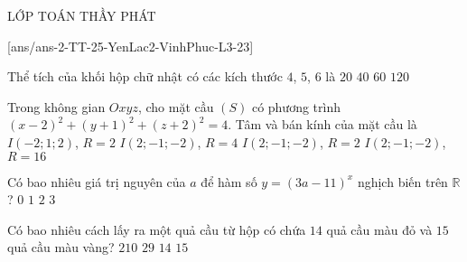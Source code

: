\begin{name}
	{\tenchude}{\tendethi}{LỚP TOÁN THẦY PHÁT}{\thoigian}
\end{name}
\setcounter{ex}{0}\setcounter{bt}{0}
[ans/ans-2-TT-25-YenLac2-VinhPhuc-L3-23]
\setcounter{ex}{0}


\begin{ex}%
	Thể tích của khối hộp chữ nhật có các kích thước $ 4 $, $ 5 $, $ 6 $ là
	\choice
	{$ 20 $}
	{$ 40 $}
	{$ 60 $}
	{\True $ 120 $}
\end{ex}

\begin{ex}%
	Trong không gian $ Oxyz $, cho mặt cầu $ (S) $ có phương trình $ (x-2)^2+(y+1)^2+(z+2)^2=4 $. Tâm và bán kính của mặt cầu là
	\choice
	{$ I(-2;1;2) $, $ R=2 $}
	{$ I(2;-1;-2) $, $ R=4 $}
	{\True $ I(2;-1;-2) $, $ R=2 $}
	{$ I(2;-1;-2) $, $ R=16 $}
\end{ex}


\begin{ex}%
	Có bao nhiêu giá trị nguyên của $ a $ để hàm số $ y=(3a-11)^x $ nghịch biến trên $ \mathbb{R} $?
	\choice
	{\True $ 0 $}
	{$ 1 $}
	{$ 2 $}
	{$ 3 $}
\end{ex}

\begin{ex}%
	Có bao nhiêu cách lấy ra một quả cầu từ hộp có chứa $ 14 $ quả cầu màu đỏ và $ 15 $ quả cầu màu vàng?
	\choice
	{$ 210 $}
	{\True $ 29 $}
	{$ 14 $}
	{$ 15 $}
\end{ex}

